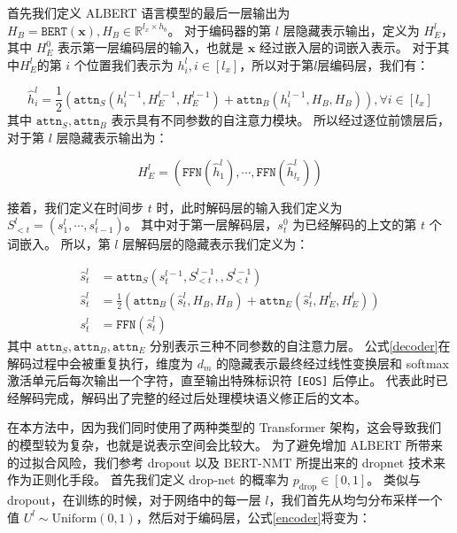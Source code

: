 首先我们定义 ALBERT 语言模型的最后一层输出为 $H_B = \texttt{BERT}(\bm{x}), H_B\in \mathbb{R}^{l_x \times h_b}$。
对于编码器的第 $l$ 层隐藏表示输出，定义为 $H_E^l$，其中 $H_E^0$ 表示第一层编码层的输入，也就是 $\bm{x}$ 经过嵌入层的词嵌入表示。
对于其中$H_E^l$的第 $i$ 个位置我们表示为 $h_i^l, i \in [l_x]$，所以对于第$l$层编码层，我们有：

\begin{equation}
	\label{encoder}
	\hat{h}_i^l = \frac{1}{2} (\texttt{attn}_S(h^{l-1}_i, H_E^{l-1}, H_E^{l-1}) + \texttt{attn}_B(h_i^{l-1}, H_B, H_B)), \forall i \in [l_x]
\end{equation}
其中 $\texttt{attn}_S, \texttt{attn}_B$ 表示具有不同参数的自注意力模块。
所以经过逐位前馈层后，对于第 $l$ 层隐藏表示输出为：

\begin{equation}
	H_E^l = (\texttt{FFN}(\hat{h}_1^l), \cdots, \texttt{FFN}(\hat{h}_{l_x}^l))
\end{equation}

接着，我们定义在时间步 $t$ 时，此时解码层的输入我们定义为 $S_{<t}^l = (s_1^l, \cdots, s_{t-1}^l)$。
其中对于第一层解码层，$s_t^0$ 为已经解码的上文的第 $t$ 个词嵌入。
所以，第 $l$ 层解码层的隐藏表示我们定义为：

\begin{align}
	\label{decoder}
	\hat{s}_{t}^l &= \texttt{attn}_S(s_t^{l-1}, S_{<t}^{l-1}, , S_{<t}^{l-1}) \\
	\hat{s}_{t}^l &= \frac{1}{2}(\texttt{attn}_B(\hat{s}_t^{l}, H_B, H_B) + \texttt{attn}_E(\hat{s}_t^l, H_E^l, H_E^l)) \\
	s_t^l &= \texttt{FFN}(\hat{s}_t^l)
\end{align}
其中 $\texttt{attn}_S, \texttt{attn}_B, \texttt{attn}_E$ 分别表示三种不同参数的自注意力层。
公式\ref{decoder}在解码过程中会被重复执行，维度为 $d_m$ 的隐藏表示最终经过线性变换层和 softmax 激活单元后每次输出一个字符，直至输出特殊标识符 \texttt{[EOS]} 后停止。
代表此时已经解码完成，解码出了完整的经过后处理模块语义修正后的文本。

在本方法中，因为我们同时使用了两种类型的 Transformer 架构，这会导致我们的模型较为复杂，也就是说表示空间会比较大。
为了避免增加 ALBERT 所带来的过拟合风险，我们参考 dropout\cite{dropout} 以及 BERT-NMT\cite{bert_nmt} 所提出来的 dropnet 技术来作为正则化手段。
首先我们定义 drop-net 的概率为 $p_{\text{drop}} \in [0,1]$。
类似与 dropout，在训练的时候，对于网络中的每一层 $l$，我们首先从均匀分布采样一个值 $U^l \sim \text{Uniform}(0,1)$，然后对于编码层，公式\ref{encoder}将变为：

